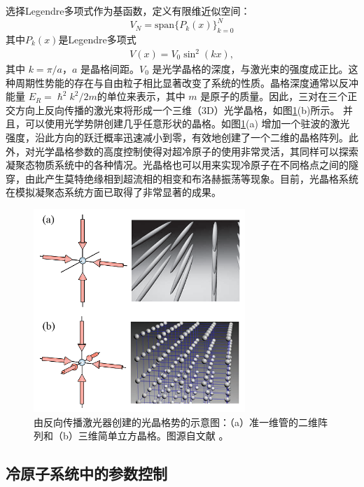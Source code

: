 选择Legendre多项式作为基函数，定义有限维近似空间：
\[ V_N = \text{span}\{P_k(x)\}_{k=0}^N \]
其中$P_k(x)$是Legendre多项式\cite{bloch2005ultracold,bloch2008many}
\begin{align}
V(x) = V_0 \sin^2(kx),
\end{align}
其中 $k = \pi / a$，$a$ 是晶格间距。$V_{0}$ 是光学晶格的深度，与激光束的强度成正比。这种周期性势能的存在与自由粒子相比显著改变了系统的性质。晶格深度通常以反冲能量 \(E_R = \hslash ^2k^2/2m\)的单位来表示，其中 \(m\) 是原子的质量。因此，三对在三个正交方向上反向传播的激光束将形成一个三维（3D）光学晶格，如图\ref{fig:optical_Bloch}(b)所示。
并且，可以使用光学势阱创建几乎任意形状的晶格。如图\ref{fig:optical_Bloch}(a) 增加一个驻波的激光强度，沿此方向的跃迁概率迅速减小到零\cite{jaksch1999entanglement}，有效地创建了一个二维的晶格阵列。此外，对光学晶格参数的高度控制使得对超冷原子的使用非常灵活，其同样可以探索凝聚态物质系统中的各种情况。光晶格也可以用来实现冷原子在不同格点之间的隧穿，由此产生莫特绝缘相到超流相的相变和布洛赫振荡等现象\cite{HuiNingju2013}。目前，光晶格系统在模拟凝聚态系统方面已取得了非常显著的成果\cite{bloch2008many,petrov2004low,hadzibabic2006berezinskii,griffin1996bose,fallani2008bose,bouyer2009anderson,becker2010ultracold,clement2008density}。

\begin{figure}
\centering
\includegraphics[width=8cm]{figures/chap01/optical_Bloch.png}
\vspace{-10pt}
\caption{由反向传播激光器创建的光晶格势的示意图：（a）准一维管的二维阵列和（b）三维简单立方晶格。图源自文献 \cite{bloch2005ultracold}。}\label{fig:optical_Bloch}
\end{figure}

\subsection{冷原子系统中的参数控制}

